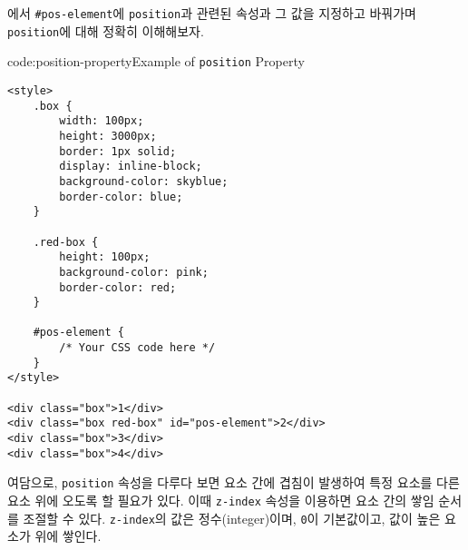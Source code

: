 에서 \texttt{\#pos-element}에 \texttt{position}과 관련된 속성과 그 값을 지정하고 바꿔가며 \texttt{position}에 대해 정확히 이해해보자.

\begin{codeenv}{code:position-property}{Example of \texttt{position} Property}\begin{verbatim}
<style>
    .box {
        width: 100px;
        height: 3000px;
        border: 1px solid;
        display: inline-block;
        background-color: skyblue;
        border-color: blue;
    }

    .red-box {
        height: 100px;
        background-color: pink;
        border-color: red;
    }

    #pos-element {
        /* Your CSS code here */
    }
</style>

<div class="box">1</div>
<div class="box red-box" id="pos-element">2</div>
<div class="box">3</div>
<div class="box">4</div>
\end{verbatim}
\end{codeenv}

여담으로, \texttt{position} 속성을 다루다 보면 요소 간에 겹침이 발생하여 특정 요소를 다른 요소 위에 오도록 할 필요가 있다. 이때 \texttt{z-index} 속성을 이용하면 요소 간의 쌓임 순서를 조절할 수 있다. \texttt{z-index}의 값은 정수(integer)이며, \texttt{0}이 기본값이고, 값이 높은 요소가 위에 쌓인다.

